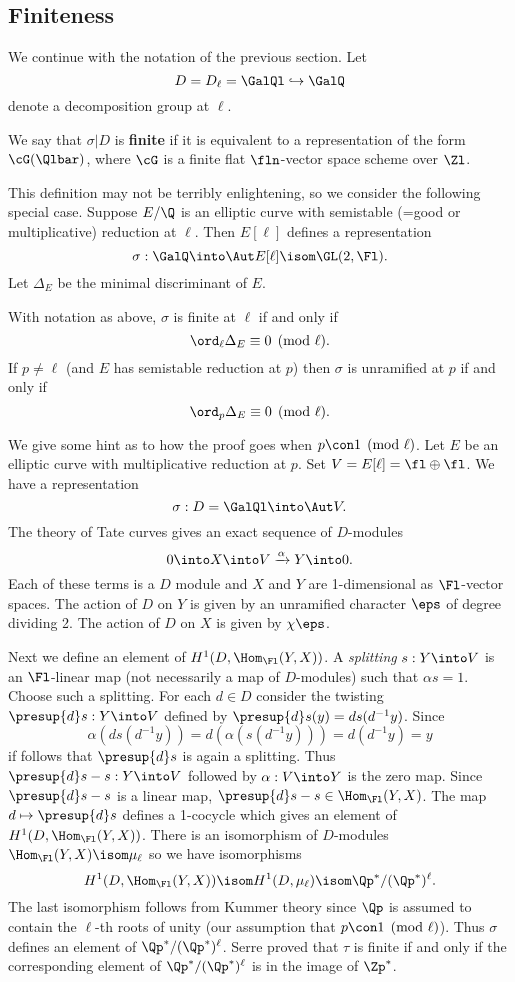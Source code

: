 \documentclass{report}
\begin{document}
\subsection{Finiteness}
We continue with the notation of the previous section.
Let
 $$D = D_{\ell}=\GalQl\hookrightarrow\GalQ$$
denote a decomposition group at $\ell$.
\begin{definition}
We say that $\sigma|D$ is {\bf finite} if it
is equivalent to a representation of the form
$\cG(\Qlbar)$, where $\cG$ is a finite flat
$\fln$-vector space scheme over $\Zl$.
\end{definition}

This definition may not be terribly enlightening, so
we consider the following special case. Suppose
$E/\Q$ is an elliptic curve with
semistable (=good or multiplicative)
reduction at $\ell$.
Then $E[\ell]$ defines a representation
$$\sigma:\GalQ\into\Aut E[\ell]\isom\GL(2,\Fl).$$
Let $\Delta_E$ be the minimal discriminant of $E$.
\begin{proposition}
With notation as above,
$\sigma$ is finite at $\ell$ if and only if
$$\ord_{\ell}\Delta_E \equiv 0\pmod{\ell}.$$
If $p\neq\ell$ (and $E$ has semistable reduction at $p$) then
$\sigma$ is unramified at $p$ if and only if
$$\ord_p\Delta_E\equiv 0\pmod{\ell}.$$
\end{proposition}

We give some hint as to how the proof goes when $p\con 1\pmod{\ell}$.
Let $E$ be an elliptic curve with multiplicative
reduction at $p$. Set $V=E[\ell]=\fl\oplus\fl$. We have a
representation
$$\sigma:D=\GalQl\into \Aut V.$$
The theory of Tate curves gives an exact sequence of $D$-modules
  $$0\into X\into V\xrightarrow{\alpha} Y\into 0.$$
Each of these terms is a $D$ module and $X$ and $Y$ are 1-dimensional
as $\Fl$-vector spaces.
The action of $D$ on $Y$ is given
by an unramified character $\eps$
of degree dividing 2.  The action
of $D$ on $X$ is given by $\chi\eps$.

Next we define an element of $H^1(D,\Hom_{\Fl}(Y,X))$.
A {\em splitting} $s:Y\into V$
is an $\Fl$-linear map (not necessarily a map of $D$-modules)
such that  $\alpha s=1$.  Choose such a splitting.
For each $d\in D$ consider the twisting
$\presup{d}s:Y\into V$ defined by $\presup{d}s(y)=ds(d^{-1}y)$.
Since
$$\alpha (d s (d^{-1}y)) = d (\alpha (s (d^{-1} y))) = d(d^{-1}y)=y$$
if follows that $\presup{d}s$ is again a splitting.
Thus $\presup{d}s-s:Y\into V$ followed by $\alpha:V\into Y$ is the
zero map.  Since $\presup{d}s-s$ is a linear map,
$\presup{d}s-s\in \Hom_{\Fl}(Y,X)$.
The map $d\mapsto \presup{d}s$ defines a 1-cocycle which
gives an element of $H^1(D,\Hom_{\Fl}(Y,X))$.
There is an isomorphism of $D$-modules
$\Hom_{\Fl}(Y,X)\isom \mu_{\ell}$ so we have isomorphisms
$$H^1(D,\Hom_{\Fl}(Y,X))\isom H^1(D,\mu_{\ell})\isom\Qp^*/(\Qp^*)^{\ell}.$$
The last isomorphism follows from Kummer theory since $\Qp$ is
assumed to contain the $\ell$-th roots of unity (our assumption
that $p\con 1\pmod{\ell}$).
Thus $\sigma$ defines an element of $\Qp^*/(\Qp^*)^\ell$.
Serre proved that $\tau$ is finite if and only if the corresponding element
of $\Qp^*/(\Qp^*)^{\ell}$ is in the image of $\Zp^*$.
\end{document}
